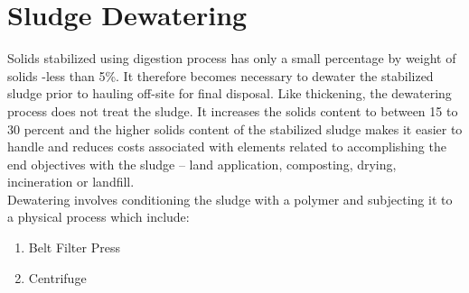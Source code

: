 \section{Sludge Dewatering}
Solids stabilized using digestion process has only a small percentage by weight of solids -less than 5\%.  It therefore becomes necessary to dewater the stabilized sludge prior to hauling off-site for final disposal.  Like thickening, the dewatering process does not treat the sludge.  It increases the solids content to between 15 to 30 percent and the higher solids content of the stabilized sludge makes it easier to handle and reduces costs associated with elements related to accomplishing the end objectives with the sludge – land application, composting, drying, incineration or landfill.\\
Dewatering involves conditioning the sludge with a polymer and subjecting it to a physical process which include:
\begin{enumerate}
\item Belt Filter Press 
\item Centrifuge
\end{enumerate}

